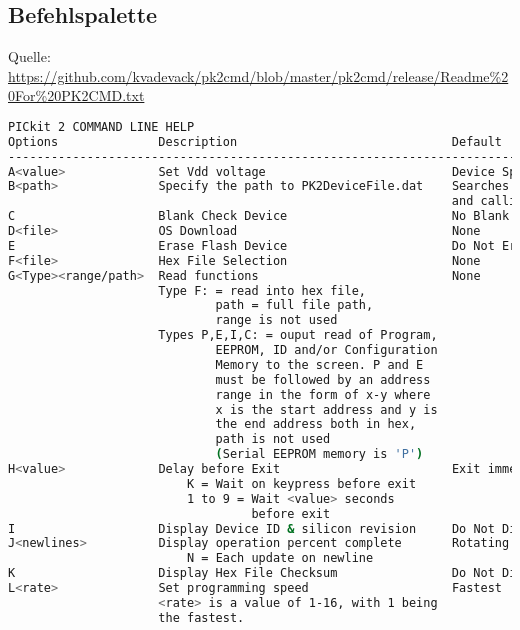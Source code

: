 \subsection{Befehlspalette}
\label{sub:commands}
Quelle: \url{https://github.com/kvadevack/pk2cmd/blob/master/pk2cmd/release/Readme%20For%20PK2CMD.txt}
\begin{center}
\begin{lstlisting}[language=bash]
PICkit 2 COMMAND LINE HELP
Options              Description                              Default
-----------------------------------------------------------------------------
A<value>             Set Vdd voltage                          Device Specific
B<path>              Specify the path to PK2DeviceFile.dat    Searches PATH
                                                              and calling dir
C                    Blank Check Device                       No Blank Check
D<file>              OS Download                              None
E                    Erase Flash Device                       Do Not Erase
F<file>              Hex File Selection                       None
G<Type><range/path>  Read functions                           None
                     Type F: = read into hex file,
                             path = full file path,
                             range is not used
                     Types P,E,I,C: = ouput read of Program,
                             EEPROM, ID and/or Configuration
                             Memory to the screen. P and E
                             must be followed by an address
                             range in the form of x-y where
                             x is the start address and y is
                             the end address both in hex,
                             path is not used
                             (Serial EEPROM memory is 'P')
H<value>             Delay before Exit                        Exit immediately
                         K = Wait on keypress before exit
                         1 to 9 = Wait <value> seconds
                                  before exit
I                    Display Device ID & silicon revision     Do Not Display
J<newlines>          Display operation percent complete       Rotating slash
                         N = Each update on newline
K                    Display Hex File Checksum                Do Not Display
L<rate>              Set programming speed                    Fastest
                     <rate> is a value of 1-16, with 1 being
                     the fastest.


\end{lstlisting}
\end{center}
